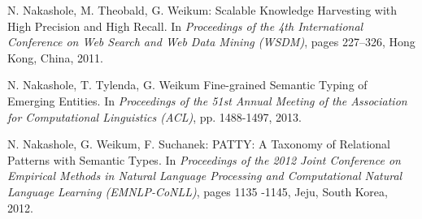 \documentclass[11pt,a4paper]{article}
\begin{document}
\begin{thebibliography}{99}
 N. Nakashole, M. Theobald, G. Weikum: Scalable Knowledge Harvesting with High Precision and High Recall.
		In \textit{Proceedings of the 4th International Conference on
		 Web Search and Web Data Mining (WSDM)}, pages 227--326, Hong Kong, China, 2011.
		 
 N. Nakashole, T. Tylenda, G. Weikum
		 Fine-grained Semantic Typing of Emerging Entities. In \textit{Proceedings of the 51st Annual Meeting of the Association for Computational Linguistics (ACL)}, pp. 1488-1497, 2013.
		 
 N. Nakashole, G. Weikum, F. Suchanek: PATTY:  A Taxonomy of Relational Patterns with Semantic Types.
		In \textit{Proceedings of the 2012 Joint Conference on Empirical Methods
               in Natural Language Processing and Computational Natural
               Language Learning (EMNLP-CoNLL)}, pages 1135 -1145, Jeju, South Korea, 2012.
          
%
%
%
%
%
 

\end{thebibliography}
\end{document}
